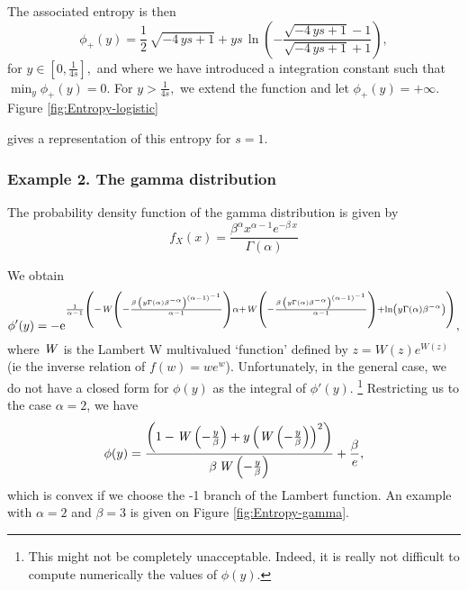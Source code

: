 \documentclass[english,onecolumn]{elsarticle}
\begin{document}
The associated entropy is then 
\[
\phi_{+}(y)=\frac{1}{2}\,\sqrt{-4\, ys+1}+ys\,\ln\left(-{\frac{\sqrt{-4\, ys+1}-1}{\sqrt{-4\, ys+1}+1}}\right),
\]
for $y\in[0,\frac{1}{4s}],$ and where we have introduced a integration
constant such that $\min_{y}\phi_{+}(y)=0.$ For $y>\frac{1}{4s},$
we extend the function and let $\phi_{+}(y)=+\infty.$ Figure \ref{fig:Entropy-logistic}
\begin{figure}
\end{figure}
gives a representation of this entropy for $s=1.$ 


\subsubsection{Example 2. The gamma distribution}

The probability density function of the gamma distribution is given
by 
\[
f_{X}(x)=\frac{{\beta}^{\alpha}{x}^{\alpha-1}{e}^{-\beta\, x}}{\Gamma\left(\alpha\right)}
\]


We obtain 
\[
\phi'(y)=-{{\rm e}^{\frac{1}{\alpha-1}\left(-{\it W}\left(-{\frac{\beta\,\left(y\Gamma\left(\alpha\right){\beta}^{-\alpha}\right)^{\left(\alpha-1\right)^{-1}}}{\alpha-1}}\right)\alpha+{\it W}\left(-{\frac{\beta\,\left(y\Gamma\left(\alpha\right){\beta}^{-\alpha}\right)^{\left(\alpha-1\right)^{-1}}}{\alpha-1}}\right)+\ln\left(y\Gamma\left(\alpha\right){\beta}^{-\alpha}\right)\right)}},
\]
where ${\it W}$ is the Lambert W multivalued `function' defined by
$z=W(z)e^{W(z)}$ (ie the inverse relation of $f(w)=we^{w}$). Unfortunately,
in the general case, we do not have a closed form for $\phi(y)$ as
the integral of $\phi'(y)$.%
\footnote{This might not be completely unacceptable. Indeed, it is really not
difficult to compute numerically the values of $\phi(y).$%
} Restricting us to the case $\alpha=2$, we have
\[
\phi(y)=\frac{\left(1-{\it W}\left(-{\frac{y}{\beta}}\right)+y\left({\it W}\left(-{\frac{y}{\beta}}\right)\right)^{2}\right)}{{\it \beta\, W}\left(-{\frac{y}{\beta}}\right)}+\frac{\beta}{e},
\]
which is convex if we choose the -1 branch of the Lambert function.
An example with $\alpha=2$ and $\beta=3$ is given on Figure \ref{fig:Entropy-gamma}.
\begin{figure}
\end{figure}
\end{document}
